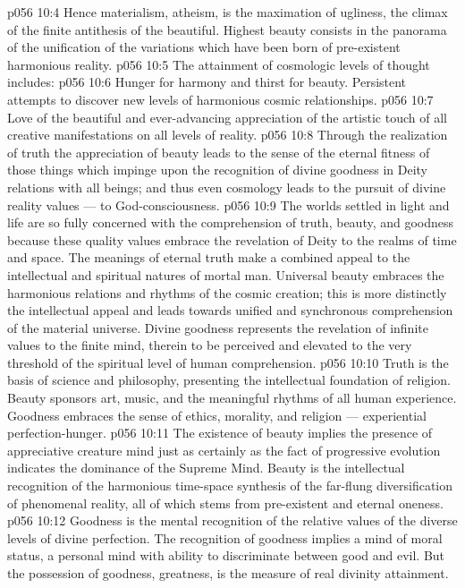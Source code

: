 \vs p056 10:4 Hence materialism, atheism, is the maximation of ugliness, the climax of the finite antithesis of the beautiful. Highest beauty consists in the panorama of the unification of the variations which have been born of pre\hyp{}existent harmonious reality.
\vs p056 10:5 The attainment of cosmologic levels of thought includes:
\vs p056 10:6 \bibnobreakspace {} Hunger for harmony and thirst for beauty. Persistent attempts to discover new levels of harmonious cosmic relationships.
\vs p056 10:7 \bibnobreakspace {} Love of the beautiful and ever\hyp{}advancing appreciation of the artistic touch of all creative manifestations on all levels of reality.
\vs p056 10:8 \bibnobreakspace {} Through the realization of truth the appreciation of beauty leads to the sense of the eternal fitness of those things which impinge upon the recognition of divine goodness in Deity relations with all beings; and thus even cosmology leads to the pursuit of divine reality values --- to God\hyp{}consciousness.
\vs p056 10:9 \pc The worlds settled in light and life are so fully concerned with the comprehension of truth, beauty, and goodness because these quality values embrace the revelation of Deity to the realms of time and space. The meanings of eternal truth make a combined appeal to the intellectual and spiritual natures of mortal man. Universal beauty embraces the harmonious relations and rhythms of the cosmic creation; this is more distinctly the intellectual appeal and leads towards unified and synchronous comprehension of the material universe. Divine goodness represents the revelation of infinite values to the finite mind, therein to be perceived and elevated to the very threshold of the spiritual level of human comprehension.
\vs p056 10:10 Truth is the basis of science and philosophy, presenting the intellectual foundation of religion. Beauty sponsors art, music, and the meaningful rhythms of all human experience. Goodness embraces the sense of ethics, morality, and religion --- experiential perfection\hyp{}hunger.
\vs p056 10:11 The existence of beauty implies the presence of appreciative creature mind just as certainly as the fact of progressive evolution indicates the dominance of the Supreme Mind. Beauty is the intellectual recognition of the harmonious time\hyp{}space synthesis of the far\hyp{}flung diversification of phenomenal reality, all of which stems from pre\hyp{}existent and eternal oneness.
\vs p056 10:12 Goodness is the mental recognition of the relative values of the diverse levels of divine perfection. The recognition of goodness implies a mind of moral status, a personal mind with ability to discriminate between good and evil. But the possession of goodness, greatness, is the measure of real divinity attainment.
